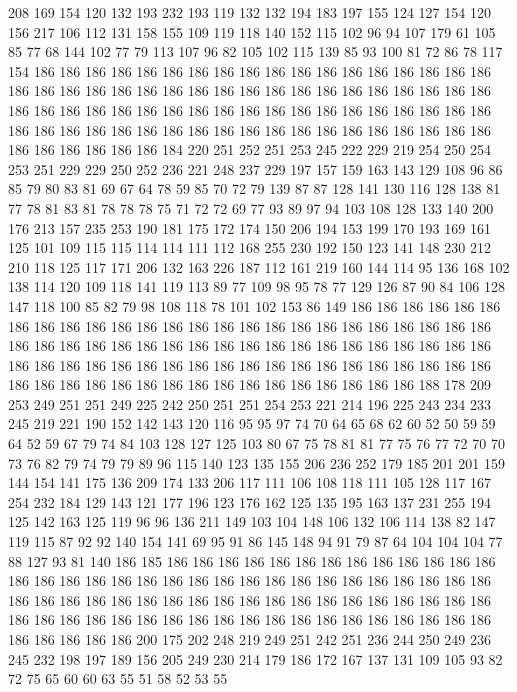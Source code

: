 208 169 154 120 132 193 232 193 119 132 132 194 183 197 155 124 127 154 120 156
217 106 112 131 158 155 109 119 118 140 152 115 102 96 94 107 179 61 105 85
77 68 144 102 77 79 113 107 96 82 105 102 115 139 85 93 100 81 72 86
78 117 154 186 186 186 186 186 186 186 186 186 186 186 186 186 186 186 186 186
186 186 186 186 186 186 186 186 186 186 186 186 186 186 186 186 186 186 186 186
186 186 186 186 186 186 186 186 186 186 186 186 186 186 186 186 186 186 186 186
186 186 186 186 186 186 186 186 186 186 186 186 186 186 186 186 186 186 186 186
186 186 186 186 184 220 251 252 251 253 245 222 229 219 254 250 254 253 251 229
229 250 252 236 221 248 237 229 197 157 159 163 143 129 108 96 86 85 79 80
83 81 69 67 64 78 59 85 70 72 79 139 87 87 128 141 130 116 128 138
81 77 78 81 83 81 78 78 78 75 71 72 72 69 77 93 89 97 94 103
108 128 133 140 200 176 213 157 235 253 190 181 175 172 174 150 206 194 153 199
170 193 169 161 125 101 109 115 115 114 114 111 112 168 255 230 192 150 123 141
148 230 212 210 118 125 117 171 206 132 163 226 187 112 161 219 160 144 114 95
136 168 102 138 114 120 109 118 141 119 113 89 77 109 98 95 78 77 129 126
87 90 84 106 128 147 118 100 85 82 79 98 108 118 78 101 102 153 86 149
186 186 186 186 186 186 186 186 186 186 186 186 186 186 186 186 186 186 186 186
186 186 186 186 186 186 186 186 186 186 186 186 186 186 186 186 186 186 186 186
186 186 186 186 186 186 186 186 186 186 186 186 186 186 186 186 186 186 186 186
186 186 186 186 186 186 186 186 186 186 186 186 186 186 186 186 186 186 186 188
178 209 253 249 251 251 249 225 242 250 251 251 254 253 221 214 196 225 243 234
233 245 219 221 190 152 142 143 120 116 95 95 97 74 70 64 65 68 62 60
52 50 59 59 64 52 59 67 79 74 84 103 128 127 125 103 80 67 75 78
81 81 77 75 76 77 72 70 70 73 76 82 79 74 79 79 89 96 115 140
123 135 155 206 236 252 179 185 201 201 159 144 154 141 175 136 209 174 133 206
117 111 106 108 118 111 105 128 117 167 254 232 184 129 143 121 177 196 123 176
162 125 135 195 163 137 231 255 194 125 142 163 125 119 96 96 136 211 149 103
104 148 106 132 106 114 138 82 147 119 115 87 92 92 140 154 141 69 95 91
86 145 148 94 91 79 87 64 104 104 104 77 88 127 93 81 140 186 185 186
186 186 186 186 186 186 186 186 186 186 186 186 186 186 186 186 186 186 186 186
186 186 186 186 186 186 186 186 186 186 186 186 186 186 186 186 186 186 186 186
186 186 186 186 186 186 186 186 186 186 186 186 186 186 186 186 186 186 186 186
186 186 186 186 186 186 186 186 186 186 186 186 186 186 200 175 202 248 219 249
251 242 251 236 244 250 249 236 245 232 198 197 189 156 205 249 230 214 179 186
172 167 137 131 109 105 93 82 72 75 65 60 60 63 55 51 58 52 53 55

